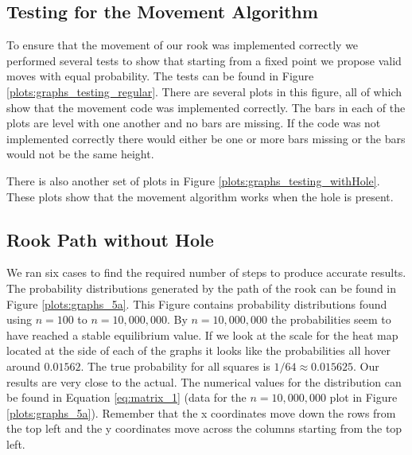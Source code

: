 \documentclass{amsart}
\numberwithin{equation}{section}
\begin{document}
\subsection{Testing for the Movement Algorithm}
To ensure that the movement of our rook was implemented correctly we performed several tests to show that starting from a fixed point we propose valid moves with equal probability. The tests can be found in Figure \ref{plots:graphs_testing_regular}. There are several plots in this figure, all of which show that the movement code was implemented correctly. The bars in each of the plots are level with one another and no bars are missing. If the code was not implemented correctly there would either be one or more bars missing or the bars would not be the same height. \par
There is also another set of plots in Figure \ref{plots:graphs_testing_withHole}. These plots show that the movement algorithm works when the hole is present. 


\subsection{Rook Path without Hole}
We ran six cases to find the required number of steps to produce accurate results. The probability distributions generated by the path of the rook can be found in Figure \ref{plots:graphs_5a}. This Figure contains probability distributions found using $n=100$ to $n=10,000,000$. By $n=10,000,000$ the probabilities seem to have reached a stable equilibrium value. If we look at the scale for the heat map located at the side of each of the graphs it looks like the probabilities all hover around $0.01562$. The true probability for all squares is $1/64\approx0.015625$. Our results are very close to the actual. The numerical values for the distribution can be found in Equation \ref{eq:matrix_1} (data for the $n=10,000,000$ plot in Figure \ref{plots:graphs_5a}). Remember that the x coordinates move down the rows from the top left and the y coordinates move across the columns starting from the top left.
\end{document}
